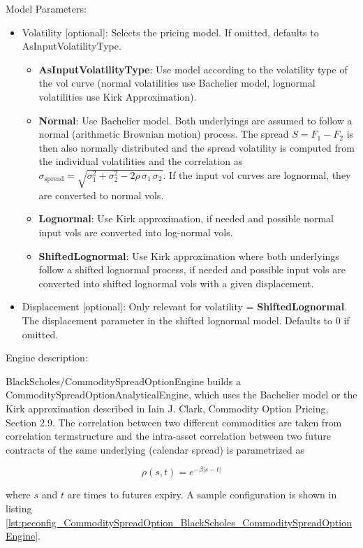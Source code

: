 Model Parameters:
\begin{itemize}
    \item Volatility [optional]: Selects the pricing model. If omitted, defaults to AsInputVolatilityType.
    \begin{itemize}
        \item \textbf{AsInputVolatilityType}: Use model according to the volatility type of the vol curve (normal
          volatilities use Bachelier model, lognormal volatilities use Kirk Approximation).
        \item \textbf{Normal}: Use Bachelier model. Both underlyings are assumed to follow a normal (arithmetic
          Brownian motion) process. The spread $S = F_1 - F_2$ is then also normally distributed and the spread
          volatility is computed from the individual volatilities and the correlation as
          $\sigma_{\text{spread}} = \sqrt{\sigma_1^2 + \sigma_2^2 - 2\rho\,\sigma_1\,\sigma_2}$.
          If the input vol curves are lognormal, they are converted to normal vols.
        \item \textbf{Lognormal}: Use Kirk approximation, if needed and possible normal input vols are converted into
          log-normal vols.
        \item \textbf{ShiftedLognormal}: Use Kirk approximation where both underlyings follow a shifted lognormal
          process, if needed and possible input vols are converted into shifted lognormal vols with a given displacement.
    \end{itemize}
    \item Displacement [optional]: Only relevant for volatility = \textbf{ShiftedLognormal}. The displacement parameter
      in the shifted lognormal model. Defaults to 0 if omitted.
\end{itemize}

Engine description:

BlackScholes/CommoditySpreadOptionEngine builds a CommoditySpreadOptionAnalyticalEngine, which uses the Bachelier model or the Kirk
approximation described in Iain J. Clark, Commodity Option Pricing, Section 2.9. The correlation between two different commodities are
taken from correlation termstructure and the intra-asset correlation between two future contracts of the same underlying (calendar spread)
is parametrized as

$$\rho(s, t) = e^{-\beta |s-t|}$$

where $s$ and $t$ are times to futures expiry. A sample configuration is shown in listing
\ref{lst:peconfig_CommoditySpreadOption_BlackScholes_CommoditySpreadOptionEngine}.

